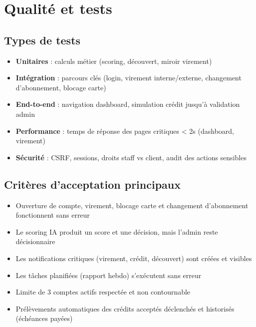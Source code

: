 \documentclass[12pt,a4paper]{report}
\begin{document}
\chapter{Qualité et tests}

\section{Types de tests}
\begin{itemize}[leftmargin=1.5cm]
    \item \textbf{Unitaires} : calculs métier (scoring, découvert, miroir virement)
    \item \textbf{Intégration} : parcours clés (login, virement interne/externe, changement d’abonnement, blocage carte)
    \item \textbf{End-to-end} : navigation dashboard, simulation crédit jusqu’à validation admin
    \item \textbf{Performance} : temps de réponse des pages critiques < 2s (dashboard, virement)
    \item \textbf{Sécurité} : CSRF, sessions, droits staff vs client, audit des actions sensibles
\end{itemize}

\section{Critères d’acceptation principaux}
\begin{itemize}[leftmargin=1.5cm]
    \item Ouverture de compte, virement, blocage carte et changement d’abonnement fonctionnent sans erreur
    \item Le scoring IA produit un score et une décision, mais l’admin reste décisionnaire
    \item Les notifications critiques (virement, crédit, découvert) sont créées et visibles
    \item Les tâches planifiées (rapport hebdo) s’exécutent sans erreur
    \item Limite de 3 comptes actifs respectée et non contournable
    \item Prélèvements automatiques des crédits acceptés déclenchés et historisés (échéances payées)
\end{itemize}
\end{document}
